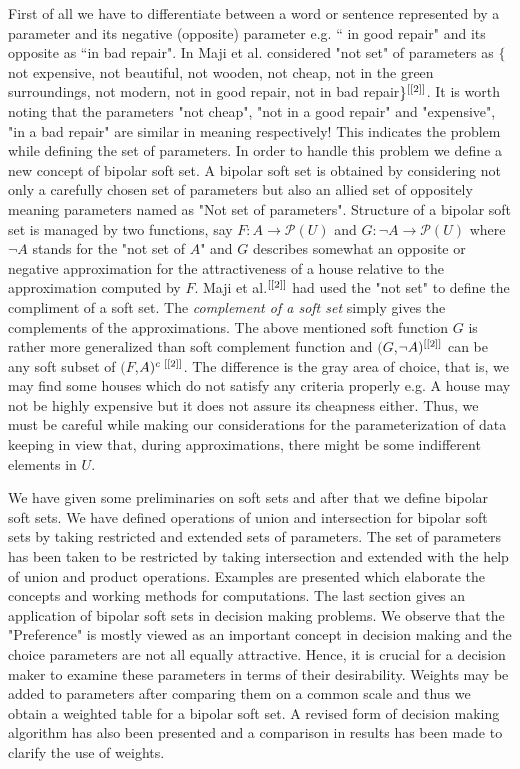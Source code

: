 \documentclass{amsart}
\theoremstyle{plain}
\numberwithin{equation}{section}
\begin{document}
First of all we have to differentiate between a word or sentence represented
by a parameter and its negative (opposite) parameter e.g. \textquotedblleft
in good repair" and its opposite as \textquotedblleft in bad repair". In 
\cite{[2]} Maji et al. considered "not set" of parameters as $\{$not
expensive, not beautiful, not wooden, not cheap, not in the green
surroundings, not modern, not in good repair, not in bad repair$\}^{\text{\cite{[2]}}}$. It is worth noting that the parameters "not cheap", "not in a
good repair" and "expensive", "in a bad repair" are similar in meaning
respectively! This indicates the problem while defining the set of
parameters. In order to handle this problem we define a new concept of
bipolar soft set. A bipolar soft set is obtained by considering not only a
carefully chosen set of parameters but also an allied set of oppositely
meaning parameters named as "Not set of parameters". Structure of a bipolar
soft set is managed by two functions, say $F:A\rightarrow \mathcal{P}(U)$
and $G:\lnot A\rightarrow \mathcal{P}(U)$ where $\lnot A$ stands for the
"not set of $A$" and $G$ describes somewhat an opposite or negative
approximation for the attractiveness of a house relative to the
approximation computed by $F$. Maji et al.$^{\text{\cite{[2]}}}$ had used
the "not set" to define the compliment of a soft set. The \textit{complement
of a soft set }simply gives the complements of the approximations. The above
mentioned soft function $G$ is rather more generalized than soft complement
function and $(G$,$\lnot A)^{\text{\cite{[2]}}}$ can be any soft subset of $(F$,$A)^{c\text{ \cite{[2]}}}$. The difference is the gray area of choice,
that is, we may find some houses which do not satisfy any criteria properly
e.g. A house may not be highly expensive but it does not assure its
cheapness either. Thus, we must be careful while making our considerations
for the parameterization of data keeping in view that, during
approximations, there might be some indifferent elements in $U$.

We have given some preliminaries on soft sets and after that we define
bipolar soft sets. We have defined operations of union and intersection for
bipolar soft sets by taking restricted and extended sets of parameters. The
set of parameters has been taken to be restricted by taking intersection and
extended with the help of union and product operations. Examples are
presented which elaborate the concepts and working methods for computations.
The last section gives an application of bipolar soft sets in decision
making problems. We observe that the "Preference" is mostly viewed as an
important concept in decision making and the choice parameters are not all
equally attractive. Hence, it is crucial for a decision maker to examine
these parameters in terms of their desirability. Weights may be added to
parameters after comparing them on a common scale and thus we obtain a
weighted table for a bipolar soft set. A revised form of decision making
algorithm has also been presented and a comparison in results has been made
to clarify the use of weights.
\end{document}
